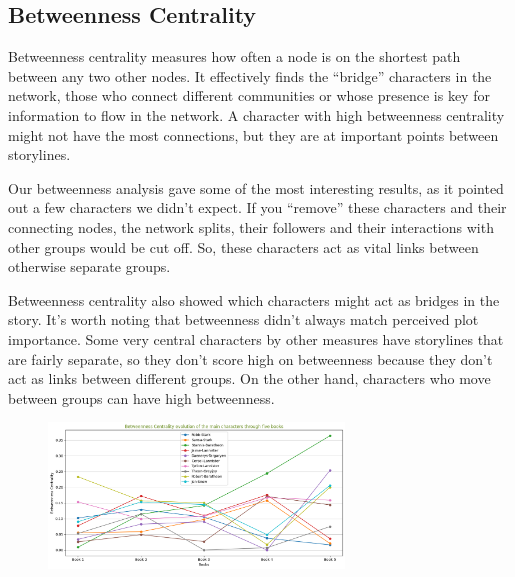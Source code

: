 \documentclass[12pt, a4paper]{article}
\begin{document}
	\subsection*{Betweenness Centrality}
	Betweenness centrality measures how often a node is on the 
	shortest path between any two other nodes. It effectively 
	finds the ``bridge'' characters in the network, those who 
	connect different communities or whose presence is key for 
	information to flow in the network. A character with high 
	betweenness centrality might not have the most connections, 
	but they are at important points between storylines. 
	
      Our betweenness analysis gave some of the most interesting 
	results, as it pointed out a few characters we didn't expect. 
	If you ``remove'' these characters and their connecting nodes, 
	the network splits, their followers 
	and their interactions with other groups would be cut off. 
	So, these characters act as  vital links between otherwise separate 
	groups. 
	
	
	Betweenness centrality also
	showed which characters might act as bridges in the story. It's 
	worth noting that betweenness didn't always match perceived plot 
	importance. Some very central characters by other measures 
	have storylines that are fairly separate, 
	so they don't score high on betweenness 
	because they don't act as links between different groups. 
	On the other hand, characters who move between groups 
	can have high betweenness. 
	
	\begin{figure}[htbp]
		\centering
		\includegraphics[width=0.7\textwidth]{betweenness-all.png}
		\label{fig:betweennessall}
	\end{figure}
	\FloatBarrier
	
	
\end{document}
